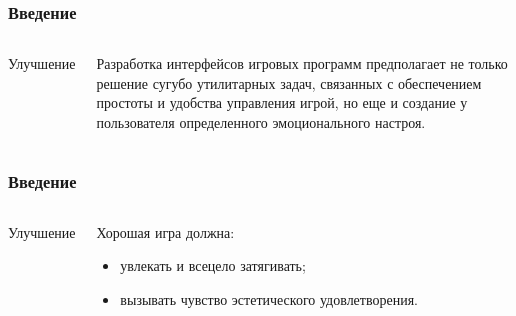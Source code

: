 \documentclass[10pt]{beamer}
\begin{document}
\begin{frame}
  \frametitle{Введение}

  \begin{columns}[c]

  \begin{center}
    Улучшение
  \end{center}

  \begin{block}{}
    Разработка интерфейсов игровых программ предполагает не только решение сугубо утилитарных задач, связанных с обеспечением простоты и удобства управления игрой, но еще и создание у пользователя определенного эмоционального настроя.
  \end{block}
  \end{columns}
\end{frame}


\begin{frame}
\frametitle{Введение}

\begin{columns}[c]

\begin{center}
  Улучшение
\end{center}

\begin{block}{}
  Хорошая игра должна:
  \begin{itemize}
    \item увлекать и всецело затягивать;
    \item вызывать чувство эстетического  удовлетворения.
  \end{itemize}
\end{block}
\end{columns}
\end{frame}
\end{document}
